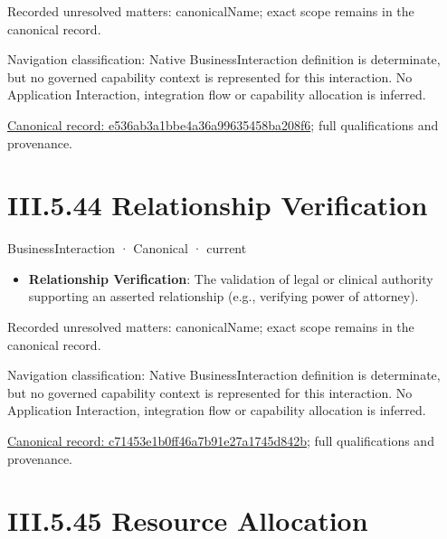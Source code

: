 {\small Recorded unresolved matters: canonicalName; exact scope remains in the canonical record.}\par
{\small Navigation classification: Native BusinessInteraction definition is determinate, but no governed capability context is represented for this interaction. No Application Interaction, integration flow or capability allocation is inferred.}\par
{\footnotesize \href{../../../../../../../../continuum/business/business-interaction/e536ab3a1bbe4a36a99635458ba208f6.md}{Canonical record: e536ab3a1bbe4a36a99635458ba208f6}; full qualifications and provenance.}\par
\section*{III.5.44 Relationship Verification}
\label{navigation:III.5.44}

\label{element:c71453e1b0ff46a7b91e27a1745d842b}
{\small BusinessInteraction · Canonical · current}\par

\begin{itemize}


\item \textbf{Relationship Verification}: The validation of legal or clinical authority supporting an asserted relationship (e.g., verifying power of attorney).

\end{itemize}

{\small Recorded unresolved matters: canonicalName; exact scope remains in the canonical record.}\par
{\small Navigation classification: Native BusinessInteraction definition is determinate, but no governed capability context is represented for this interaction. No Application Interaction, integration flow or capability allocation is inferred.}\par
{\footnotesize \href{../../../../../../../../continuum/business/business-interaction/c71453e1b0ff46a7b91e27a1745d842b.md}{Canonical record: c71453e1b0ff46a7b91e27a1745d842b}; full qualifications and provenance.}\par
\section*{III.5.45 Resource Allocation}
\label{navigation:III.5.45}

